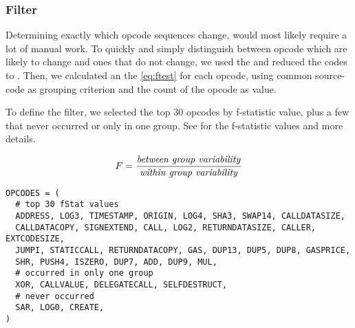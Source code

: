 \documentclass[../main.tex]{subfiles}
\begin{document}
\subsubsection{ Filter \label{sec:fStat}}
Determining exactly which opcode sequences change, would most likely require a lot of manual work.
To quickly and simply distinguish between opcode which are likely to change and ones that do not change, we used the \n{\solcts}  and reduced the codes to  . Then, we calculated an the  \eqref{eq:ftest} for each opcode, using common source-code as grouping criterion and the count of the opcode as value.

To define the  filter, we selected the top 30 opcodes by f-statistic value, plus a few that never occurred or only in one group. See  for the f-statistic values and more details.

\begin{equation}
  F = \dfrac{\mbox{\textit{between group variability}}}{\mbox{\textit{within group variability}}}
  \label{eq:ftest}
\end{equation}

\begin{lstlisting}[style=pymd]
OPCODES = (
  # top 30 fStat values
  ADDRESS, LOG3, TIMESTAMP, ORIGIN, LOG4, SHA3, SWAP14, CALLDATASIZE,
  CALLDATACOPY, SIGNEXTEND, CALL, LOG2, RETURNDATASIZE, CALLER, EXTCODESIZE,
  JUMPI, STATICCALL, RETURNDATACOPY, GAS, DUP13, DUP5, DUP8, GASPRICE,
  SHR, PUSH4, ISZERO, DUP7, ADD, DUP9, MUL,
  # occurred in only one group
  XOR, CALLVALUE, DELEGATECALL, SELFDESTRUCT,
  # never occurred
  SAR, LOG0, CREATE,
)
\end{lstlisting}
\end{document}
